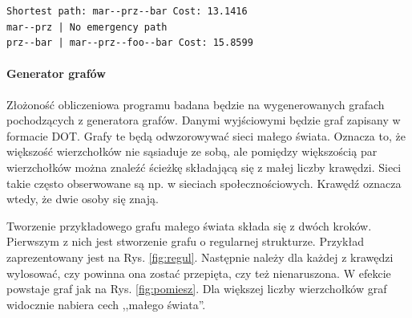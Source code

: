 \documentclass[a4paper, 12pt]{article}
\begin{document}
\begin{verbatim}
Shortest path: mar--prz--bar Cost: 13.1416
mar--prz | No emergency path
prz--bar | mar--prz--foo--bar Cost: 15.8599
\end{verbatim}

\paragraph{Generator grafów}
\label{generator}
Złożoność obliczeniowa programu badana będzie na wygenerowanych grafach pochodzących z generatora grafów. Danymi wyjściowymi będzie graf zapisany w formacie DOT. Grafy te będą odwzorowywać sieci małego świata\cite{amaral2000classes}. Oznacza to, że większość wierzchołków nie sąsiaduje ze sobą, ale pomiędzy większością par wierzchołków można znaleźć ścieżkę składającą się z małej liczby krawędzi. Sieci takie często obserwowane są np. w sieciach społecznościowych. Krawędź oznacza wtedy, że dwie osoby się znają.

Tworzenie przykładowego grafu małego świata składa się z dwóch kroków. Pierwszym z nich jest stworzenie grafu o regularnej strukturze. Przykład zaprezentowany jest na Rys. \ref{fig:regul}. Następnie należy dla każdej z krawędzi wylosować, czy powinna ona zostać przepięta, czy też nienaruszona. W efekcie powstaje graf jak na Rys. \ref{fig:pomiesz}. Dla większej liczby wierzchołków graf widocznie nabiera cech ,,małego świata''.
\end{document}
